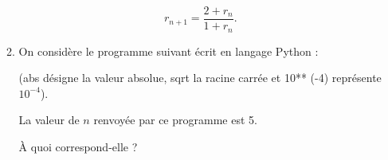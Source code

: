 \begin{enumerate}
\begin{enumerate}
\[r_{n+1} = \dfrac{2 + r_n}{1 + r_n}.\]

		\item On considère le programme suivant écrit en langage Python :
		
\begin{center}
\end{center}

\smallskip

(abs désigne la valeur absolue, sqrt la racine carrée et 10** (-4) représente $10^{-4}$).

La valeur de $n$ renvoyée par ce programme est 5.

 À quoi correspond-elle ?
	\end{enumerate}
\end{enumerate}

\bigskip

